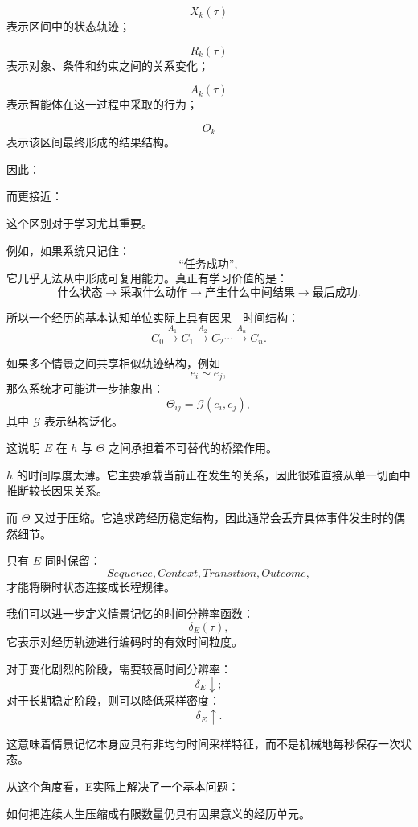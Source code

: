 \[
X_k(\tau)
\]
表示区间中的状态轨迹；

\[
R_k(\tau)
\]
表示对象、条件和约束之间的关系变化；

\[
A_k(\tau)
\]
表示智能体在这一过程中采取的行为；

\[
O_k
\]
表示该区间最终形成的结果结构。

因此：
\begin{statementbox}
\centering
{}
\end{statementbox}
而更接近：
\begin{statementbox}
\centering
{}
\end{statementbox}

这个区别对于学习尤其重要。

例如，如果系统只记住：
\[
\text{“任务成功”},
\]
它几乎无法从中形成可复用能力。真正有学习价值的是：
\[
\text{什么状态}
\rightarrow
\text{采取什么动作}
\rightarrow
\text{产生什么中间结果}
\rightarrow
\text{最后成功}.
\]

所以一个经历的基本认知单位实际上具有因果—时间结构：
\[
C_0
\xrightarrow{A_1}
C_1
\xrightarrow{A_2}
C_2
\cdots
\xrightarrow{A_n}
C_n.
\]

如果多个情景之间共享相似轨迹结构，例如
\[
e_i\sim e_j,
\]
那么系统才可能进一步抽象出：
\[
\Theta_{ij}
=
\mathcal G(e_i,e_j),
\]
其中 \(\mathcal G\) 表示结构泛化。

这说明 \(E\) 在 \(h\) 与 \(\Theta\) 之间承担着不可替代的桥梁作用。

\(h\) 的时间厚度太薄。它主要承载当前正在发生的关系，因此很难直接从单一切面中推断较长因果关系。

而 \(\Theta\) 又过于压缩。它追求跨经历稳定结构，因此通常会丢弃具体事件发生时的偶然细节。

只有 \(E\) 同时保留：
\[
Sequence,
Context,
Transition,
Outcome,
\]
才能将瞬时状态连接成长程规律。

我们可以进一步定义情景记忆的时间分辨率函数：
\[
\delta_E(\tau),
\]
它表示对经历轨迹进行编码时的有效时间粒度。

对于变化剧烈的阶段，需要较高时间分辨率：
\[
\delta_E\downarrow;
\]
对于长期稳定阶段，则可以降低采样密度：
\[
\delta_E\uparrow.
\]

这意味着情景记忆本身应具有非均匀时间采样特征，而不是机械地每秒保存一次状态。

从这个角度看，E实际上解决了一个基本问题：

\begin{statementbox}
如何把连续人生压缩成有限数量仍具有因果意义的经历单元。
\end{statementbox}

